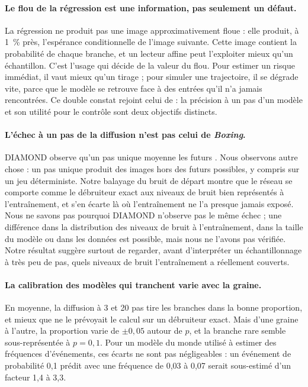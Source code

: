 \documentclass[a4paper, 11pt]{article}
\begin{document}
\paragraph{Le flou de la régression est une information, pas seulement un défaut.} La régression ne produit pas une image
approximativement floue : elle produit, à 1~\% près, l'espérance conditionnelle de l'image suivante. Cette image contient la
probabilité de chaque branche, et un lecteur affine peut l'exploiter mieux qu'un échantillon. C'est l'usage qui décide de la valeur du flou. Pour estimer un risque immédiat, il vaut mieux qu'un tirage ; pour simuler une trajectoire, il se dégrade
vite, parce que le modèle se retrouve face à des entrées qu'il n'a jamais rencontrées. Ce double constat rejoint celui de
\textcite{lambert2020objective} : la précision à un pas d'un modèle et son utilité pour le contrôle sont deux objectifs
distincts.

\paragraph{L'échec à un pas de la diffusion n'est pas celui de \emph{Boxing}.} DIAMOND observe qu'un pas unique moyenne les
futurs \parencite[§5.2]{alonso2024diamond}. Nous observons autre chose : un pas unique produit des images hors des futurs
possibles, y compris sur un jeu déterministe. Notre balayage du bruit de départ montre que le réseau se comporte comme le
débruiteur exact aux niveaux de bruit bien représentés à l'entraînement, et s'en écarte là où l'entraînement ne l'a presque
jamais exposé. Nous ne savons pas pourquoi DIAMOND n'observe pas le même échec ; une différence dans la distribution des
niveaux de bruit à l'entraînement, dans la taille du modèle ou dans les données est possible, mais nous ne l'avons pas
vérifiée. Notre résultat suggère surtout de regarder, avant d'interpréter un échantillonnage à très peu de pas, quels niveaux
de bruit l'entraînement a réellement couverts.

\paragraph{La calibration des modèles qui tranchent varie avec la graine.} En moyenne, la diffusion à 3 et 20 pas tire les
branches dans la bonne proportion, et mieux que ne le prévoyait le calcul sur un débruiteur exact. Mais d'une graine à l'autre,
la proportion varie de $\pm 0{,}05$ autour de $p$, et la branche rare semble sous-représentée à $p = 0{,}1$. Pour un modèle du
monde utilisé à estimer des fréquences d'événements, ces écarts ne sont pas négligeables : un événement de probabilité 0,1
prédit avec une fréquence de 0,03 à 0,07 serait sous-estimé d'un facteur 1,4 à 3,3.
\end{document}
